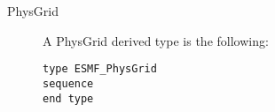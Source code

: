 

\begin{description}

\item [PhysGrid] A PhysGrid derived type is the following:
\begin{verbatim}
type ESMF_PhysGrid
sequence
end type
\end{verbatim}


\end{description}



